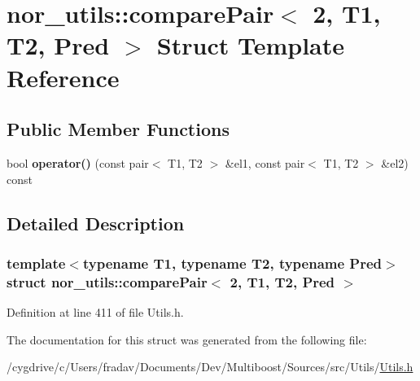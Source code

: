 \hypertarget{structnor__utils_1_1comparePair_3_012_00_01T1_00_01T2_00_01Pred_01_4}{
\section{nor\_\-utils::comparePair$<$ 2, T1, T2, Pred $>$ Struct Template Reference}
\label{structnor__utils_1_1comparePair_3_012_00_01T1_00_01T2_00_01Pred_01_4}
}
\subsection*{Public Member Functions}
\begin{DoxyCompactItemize}
\item 
\hypertarget{structnor__utils_1_1comparePair_3_012_00_01T1_00_01T2_00_01Pred_01_4_a1125a3847cb5be7957558ccad41bd9e1}{
bool {\bfseries operator()} (const pair$<$ T1, T2 $>$ \&el1, const pair$<$ T1, T2 $>$ \&el2) const }
\label{structnor__utils_1_1comparePair_3_012_00_01T1_00_01T2_00_01Pred_01_4_a1125a3847cb5be7957558ccad41bd9e1}

\end{DoxyCompactItemize}


\subsection{Detailed Description}
\subsubsection*{template$<$typename T1, typename T2, typename Pred$>$struct nor\_\-utils::comparePair$<$ 2, T1, T2, Pred $>$}



Definition at line 411 of file Utils.h.



The documentation for this struct was generated from the following file:\begin{DoxyCompactItemize}
\item 
/cygdrive/c/Users/fradav/Documents/Dev/Multiboost/Sources/src/Utils/\hyperlink{Utils_8h}{Utils.h}\end{DoxyCompactItemize}
